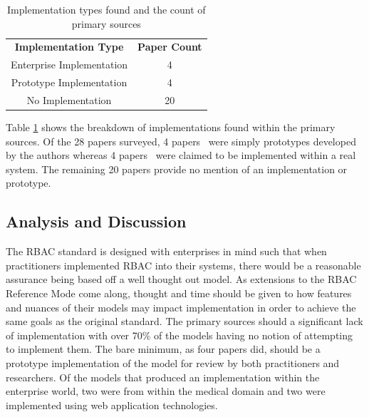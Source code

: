 \begin{table}
\centering
\caption{Implementation types found and the count of primary sources}
\begin{tabular}{ | c | c | }
\cline{1-2}

\textbf{Implementation Type} & \textbf{Paper Count} \\ \cline{1-2}
Enterprise Implementation & 4 \\ \cline{1-2}
Prototype Implementation & 4 \\ \cline{1-2}
No Implementation & 20 \\

\cline{1-2}
\end{tabular}
\label{tab:implementations}
\end{table}

Table \ref{tab:implementations} shows the breakdown of implementations found within the primary sources.
Of the 28 papers surveyed, 4 papers~\cite{zhou2007team,bao08:role, cholewka00:acontext-sensitive,huang06:pervasive} were simply prototypes developed by the authors whereas 4 papers~\cite{jian2008extended, aich09:role, yao2008task, motta03:contextual} were claimed to be implemented within a real
system. The remaining 20 papers provide no
mention of an implementation or prototype.  


\subsection{Analysis and Discussion}

The RBAC standard is designed with enterprises in mind such that when practitioners implemented RBAC into their systems,
there would be a reasonable assurance being based off a well thought out model.  As extensions to the RBAC Reference Mode
come along, thought and time should be given to how features and nuances of their models may impact implementation
in order to achieve the same goals as the original standard.  The primary sources should a significant lack of implementation
with over 70\% of the models having no notion of attempting to implement them.  The bare minimum, as four papers did, should be
a prototype implementation of the model for review by both practitioners and researchers. Of the models that produced an 
implementation within the enterprise world, two were from within the medical domain and two were implemented using web application technologies.  

